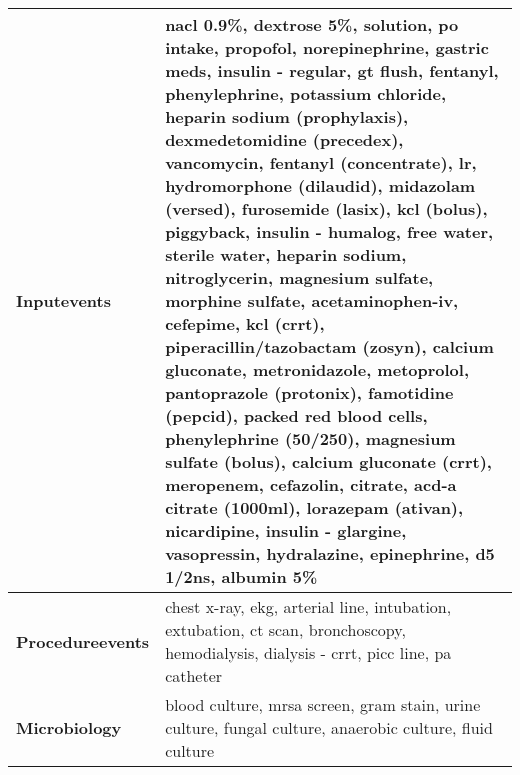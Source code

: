 \begin{table*}[h]
{\begin{tabularx}{\textwidth}{lX}
            \midrule
            \textbf{Inputevents} & 
            nacl 0.9\%, dextrose 5\%, solution, po intake, propofol, norepinephrine, gastric meds, insulin - regular, gt flush, fentanyl, phenylephrine, potassium chloride, heparin sodium (prophylaxis), dexmedetomidine (precedex), vancomycin, fentanyl (concentrate), lr, hydromorphone (dilaudid), midazolam (versed), furosemide (lasix), kcl (bolus), piggyback, insulin - humalog, free water, sterile water, heparin sodium, nitroglycerin, magnesium sulfate, morphine sulfate, acetaminophen-iv, cefepime, kcl (crrt), piperacillin/tazobactam (zosyn), calcium gluconate, metronidazole, metoprolol, pantoprazole (protonix), famotidine (pepcid), packed red blood cells, phenylephrine (50/250), magnesium sulfate (bolus), calcium gluconate (crrt), meropenem, cefazolin, citrate, acd-a citrate (1000ml), lorazepam (ativan), nicardipine, insulin - glargine, vasopressin, hydralazine, epinephrine, d5 1/2ns, albumin 5\% \\  
            \midrule
            \textbf{Procedureevents} & 
            chest x-ray, ekg, arterial line, intubation, extubation, ct scan, bronchoscopy, hemodialysis, dialysis - crrt, picc line, pa catheter \\  
            \midrule
            \textbf{Microbiology} & 
            blood culture, mrsa screen, gram stain, urine culture, fungal culture, anaerobic culture, fluid culture \\  
            \bottomrule
        \end{tabularx}
    }
\end{table*}
